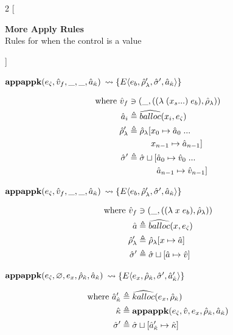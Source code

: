\documentclass[12pt,draft]{article}
\newcommand{\lamsyn}[2]{(\lambda\;(#1 ...)\;#2)}
\newcommand{\vararglamsyn}[2]{(\lambda\;#1\;#2)}
\newcommand{\E}[4]{E\langle #1 , #2 , #3 , #4 \rangle}
\begin{document}
\begin{multicols*}{2}
[
\begin{center}
\textbf{More Apply Rules} \\
Rules for when the control is a value
\end{center}
]
\begin{center}
  $\textbf{appappk}(e_{\hat{\varsigma}}, \hat{v}_f , \_, \_ , \hat{a}_{\hat{\kappa}})$
  $\leadsto \{\E{e_b}{\aenv_{\lambda}'}{\astore'}{\akaddr}\}$
\end{center}
\vspace{-7mm}
\begin{align*}
  \text{where }
  \aval_f &\ni (\_, (\lamsyn{x_s}{e_b} , \aenv_{\lambda})) \\
  \abaddr_i &\triangleq \aballoc{x_i , \ectrl} \\
  \aenv_{\lambda}' &\triangleq \aenv_{\lambda}[x_0 \mapsto \abaddr_0\;... \\
                        &\;\;\;\;\;\;\;\;\;\,x_{n-1} \mapsto \abaddr_{n-1}] \\
  \astore' &\triangleq \astore \sqcup [\abaddr_0 \mapsto \aval_0\;... \\
                        &\;\;\;\;\;\;\;\;\;\;\;\;\abaddr_{n-1} \mapsto \aval_{n-1}]
\end{align*}
\begin{center}
  $\textbf{appappk}(e_{\hat{\varsigma}}, \hat{v}_f, \_, \_, \hat{a}_{\hat{\kappa}})$
  $\leadsto \{\E{e_b}{\aenv_{\lambda}'}{\astore'}{\akaddr}\}$
\end{center}
\vspace{-7mm}
\begin{align*}
  \text{where }
  \aval_f &\ni (\_, (\vararglamsyn{x}{e_b} , \aenv_{\lambda})) \\
  \abaddr &\triangleq \aballoc{x , \ectrl} \\
  \aenv_{\lambda}' &\triangleq \aenv_{\lambda}[x \mapsto \abaddr] \\
  \astore' &\triangleq \astore \sqcup [\abaddr \mapsto \aval]
\end{align*}
\begin{center}
  $\textbf{appappk}(e_{\hat{\varsigma}}, \varnothing , e_x , \hat{\rho}_{\hat{\kappa}} , \hat{a}_{\hat{\kappa}})$
  $\leadsto \{\E{e_x}{\aenv_{\akont}}{\astore'}{\akaddr'}\}$
\end{center}
\vspace{-7mm}
\begin{align*}
  \text{where }
  \hat{a}_{\hat{\kappa}}' &\triangleq \widehat{kalloc}(e_x , \hat{\rho}_{\hat{\kappa}}) \\
  \hat{\kappa} &\triangleq \textbf{appappk}(e_{\hat{\varsigma}},\hat{v},e_x,\hat{\rho}_{\hat{\kappa}},\hat{a}_{\hat{\kappa}}) \\
  \hat{\sigma}' &\triangleq \hat{\sigma} \sqcup [\hat{a}_{\hat{\kappa}}' \mapsto \hat{\kappa}]
\end{align*}


\end{multicols*}
\end{document}
